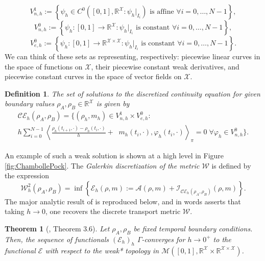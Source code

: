 \documentclass{article}
\newtheorem{theorem}{Theorem}
\newtheorem{definition}{Definition}
\newcommand{\R}{\mathbb{R}}
\newcommand{\M}{\mathcal{M}}
\newcommand{\E}{\mathcal{E}}
\newcommand{\A}{\mathcal{A}}
\newcommand{\I}{\mathcal{I}}
\newcommand{\W}{\mathcal{W}}
\newcommand{\X}{\mathcal{X}}
\DeclareMathOperator*{\divx}{div_{\X}}
\begin{document}
\[V_{n,h}^1 := \left\{ \psi_h \in C^0([0,1], \R^\X : \psi_h|_{I_i}) \text{ is affine } \forall i=0, \dots, N-1 \right\},\]
\[V_{n,h}^0 := \left\{ \psi_h :[0,1] \to \R^\X : \psi_h|_{I_i} \text{ is constant } \forall i=0, \dots, N-1 \right\},\]
\[V_{e,h}^0 := \left\{ \psi_h :[0,1] \to \R^{\X\times\X} : \psi_h|_{I_i} \text{ is constant } \forall i=0, \dots, N-1 \right\}.\]
We can think of these sets as representing, respectively: piecewise linear curves in the space of functions on \(\X\), their piecewise constant weak derivatives, and piecewise constant curves in the space of vector fields on \(\X\).
\begin{definition}
  The set of solutions to the \emph{discretized continuity equation} for given boundary values \(\rho_A, \rho_B \in \R^\X\) is given by
  \begin{multline*}
  \mathcal{CE}_h(\rho_A, \rho_B) = \Big\{ (\rho_h, m_h) \in V_{n,h}^{1}\times V_{e,h}^0 : \\
  h \sum\limits_{i=0}^{N-1}\left\langle \frac{\rho_h(t_{i+1}, \cdot) - \rho_{h}(t_i, \cdot)}{h} + \divx m_h(t_i, \cdot), \varphi_h(t_i, \cdot) \right\rangle_\pi = 0 \; \forall \varphi_h \in V_{n,h}^0 \Big\}.
  \end{multline*}
\end{definition}
\noindent  An example of such a weak solution is shown at a high level in Figure \ref{fig:ChambollePock}. The \emph{Galerkin discretization of the metric \(\W\)} is defined by the expression
 \[\W_h^2(\rho_A, \rho_B) = \inf \left\{\E_h(\rho, m) := \A(\rho, m) + \I_{\mathcal{CE}_h(\rho_A, \rho_B)}(\rho,m) \right\}.\]
The major analytic result of \cite{erbarComputationOptimalTransport2020} is reproduced below, and in words asserts that taking \(h \to 0\), one recovers the discrete transport metric \(\W\).


\begin{theorem}[\cite{erbarComputationOptimalTransport2020}, Theorem 3.6]
  Let \(\rho_A, \rho_B\) be fixed temporal boundary conditions. Then, the sequence of functionals \((\E_h)_h\) \(\Gamma\)-converges for \(h\to 0^+\) to the functional \(\E\) with respect to the weak* topology in \(\M([0,1], \R^\X \times \R^{\X\times\X})\).
\end{theorem}
\end{document}

